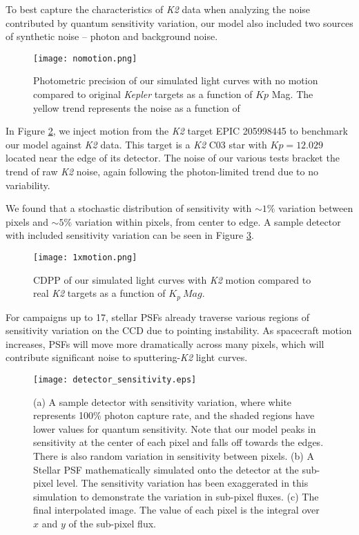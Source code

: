 \documentclass[12pt,preprint]{aastex}
\begin{document}
To best capture the characteristics of \textit{K2} data when analyzing the noise contributed by quantum sensitivity variation, our model also included two sources of synthetic noise -- photon and background noise.

\begin{figure}[h]
	\centering
	\texttt{[image: nomotion.png]}
	\caption{Photometric precision of our simulated light curves with no motion compared to original \textit{Kepler} targets as a function of $Kp$ Mag. The yellow trend represents the noise as a function of }
	\label{fig:nomotion}
\end{figure}

In Figure \ref{fig:1motion}, we inject motion from the \textit{K2} target EPIC 205998445 to benchmark our model against \textit{K2} data. This target is a  \textit{K2} C03 star with $Kp = 12.029$ located near the edge of its detector. The noise of our various tests bracket the trend of raw \textit{K2} noise, again following the photon-limited trend due to no variability.

We found that a stochastic distribution of sensitivity with ${\sim}1\%$ variation between pixels and ${\sim}5\%$ variation within pixels, from center to edge. A sample detector with included sensitivity variation can be seen in Figure \ref{fig:detector_sensitivity}.

\begin{figure}[h]
	\centering
	\texttt{[image: 1xmotion.png]}
	\caption{CDPP of our simulated light curves with \textit{K2} motion compared to real \textit{K2} targets as a function of $K_p\ Mag$.}
	\label{fig:1motion}
\end{figure}

For campaigns up to 17, stellar PSFs already traverse various regions of sensitivity variation on the CCD due to pointing instability. As spacecraft motion increases, PSFs will move more dramatically across many pixels, which will contribute significant noise to sputtering-\textit{K2} light curves.

\begin{figure}[h]
	\centering
	\texttt{[image: detector\_sensitivity.eps]}
	\caption{(a) A sample detector with sensitivity variation, where white represents 100\% photon capture rate, and the shaded regions have lower values for quantum sensitivity. Note that our model peaks in sensitivity at the center of each pixel and falls off towards the edges. There is also random variation in sensitivity between pixels. (b) A Stellar PSF mathematically simulated onto the detector at the sub-pixel level. The sensitivity variation has been exaggerated in this simulation to demonstrate the variation in sub-pixel fluxes. (c) The final interpolated image. The value of each pixel is the integral over $x$ and $y$ of the sub-pixel flux.}
	\label{fig:detector_sensitivity}
\end{figure}
\end{document}
